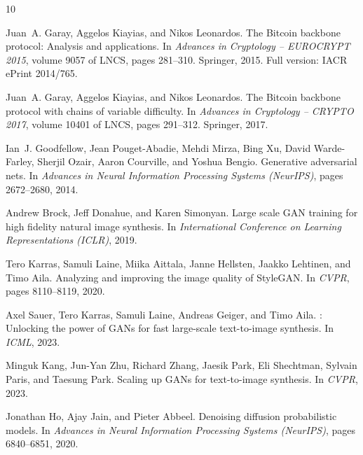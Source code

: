 \documentclass[11pt]{article}
\begin{document}


\begin{thebibliography}{10}

Juan~A. Garay, Aggelos Kiayias, and Nikos Leonardos.
\newblock The {B}itcoin backbone protocol: Analysis and applications.
\newblock In \emph{Advances in Cryptology -- EUROCRYPT 2015}, volume 9057 of LNCS, pages 281--310. Springer, 2015.
\newblock Full version: IACR ePrint 2014/765.

Juan~A. Garay, Aggelos Kiayias, and Nikos Leonardos.
\newblock The {B}itcoin backbone protocol with chains of variable difficulty.
\newblock In \emph{Advances in Cryptology -- CRYPTO 2017}, volume 10401 of LNCS, pages 291--312. Springer, 2017.

Ian~J. Goodfellow, Jean Pouget-Abadie, Mehdi Mirza, Bing Xu, David Warde-Farley, Sherjil Ozair, Aaron Courville, and Yoshua Bengio.
\newblock Generative adversarial nets.
\newblock In \emph{Advances in Neural Information Processing Systems (NeurIPS)}, pages 2672--2680, 2014.

Andrew Brock, Jeff Donahue, and Karen Simonyan.
\newblock Large scale {GAN} training for high fidelity natural image synthesis.
\newblock In \emph{International Conference on Learning Representations (ICLR)}, 2019.

Tero Karras, Samuli Laine, Miika Aittala, Janne Hellsten, Jaakko Lehtinen, and Timo Aila.
\newblock Analyzing and improving the image quality of {StyleGAN}.
\newblock In \emph{CVPR}, pages 8110--8119, 2020.

Axel Sauer, Tero Karras, Samuli Laine, Andreas Geiger, and Timo Aila.
: Unlocking the power of {GANs} for fast large-scale text-to-image synthesis.
\newblock In \emph{ICML}, 2023.

Minguk Kang, Jun-Yan Zhu, Richard Zhang, Jaesik Park, Eli Shechtman, Sylvain Paris, and Taesung Park.
\newblock Scaling up {GANs} for text-to-image synthesis.
\newblock In \emph{CVPR}, 2023.

Jonathan Ho, Ajay Jain, and Pieter Abbeel.
\newblock Denoising diffusion probabilistic models.
\newblock In \emph{Advances in Neural Information Processing Systems (NeurIPS)}, pages 6840--6851, 2020.


\end{thebibliography}
\end{document}
